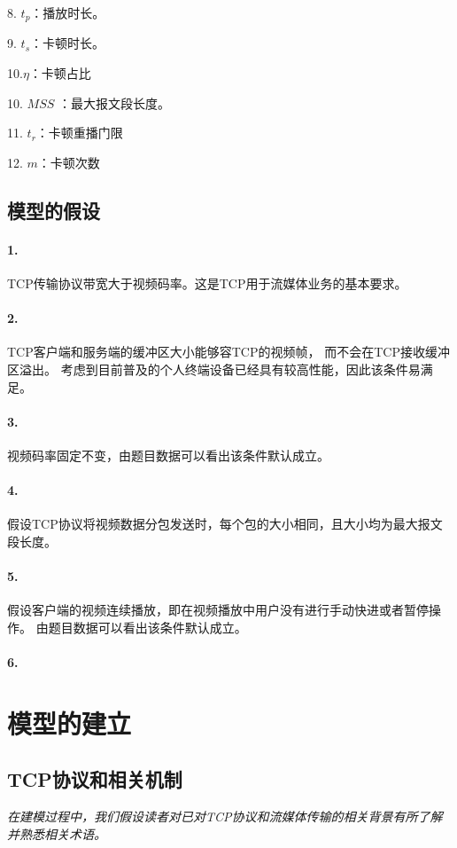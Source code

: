 \documentclass[UTF8]{ctexart}
\begin{document}
8. $t_{p} $：播放时长。

9. $t_{s} $：卡顿时长。

10.$\eta$：卡顿占比

10. $MSS$ ：最大报文段长度。

11. $t_{r}$：卡顿重播门限

12. $m$：卡顿次数

\subsection{模型的假设}
\paragraph{1.}
TCP传输协议带宽大于视频码率。这是TCP用于流媒体业务的基本要求。
\paragraph{2.}
TCP客户端和服务端的缓冲区大小能够容TCP的视频帧， 而不会在TCP接收缓冲区溢出。
考虑到目前普及的个人终端设备已经具有较高性能，因此该条件易满足。
\paragraph{3.}
视频码率固定不变，由题目数据可以看出该条件默认成立。
\paragraph{4.}
假设TCP协议将视频数据分包发送时，每个包的大小相同，且大小均为最大报文段长度。
\paragraph{5.}
假设客户端的视频连续播放，即在视频播放中用户没有进行手动快进或者暂停操作。
由题目数据可以看出该条件默认成立。
\paragraph{6.}




\section{模型的建立}
\subsection{TCP协议和相关机制}
\emph{在建模过程中，我们假设读者对已对TCP协议和流媒体传输的相关背景有所了解并熟悉相关术语。}
\end{document}
